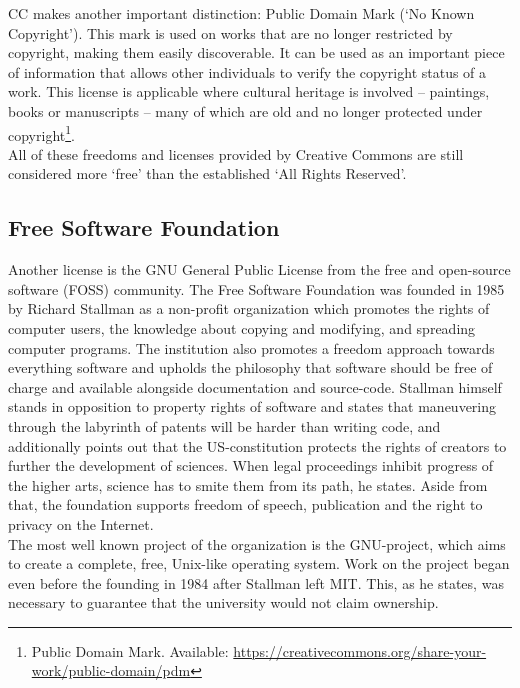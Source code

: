 \documentclass[a4paper]{article}
\begin{document}
\noindent
CC makes another important distinction: Public Domain Mark (`No Known Copyright'). This mark is used on works that are no longer restricted by copyright, making them easily discoverable. It can be used as an important piece of information that allows other individuals to verify the copyright status of a work. This license is applicable where cultural heritage is involved -- paintings, books or manuscripts -- many of which are old and no longer protected under copyright\footnote{Public Domain Mark. Available: \url{https://creativecommons.org/share-your-work/public-domain/pdm}}.\\

\noindent
All of these freedoms and licenses provided by Creative Commons are still considered more `free' than the established `All Rights Reserved'.

\subsection{Free Software Foundation}

Another license is the GNU General Public License from the free and open-source software (FOSS) community. The Free Software Foundation was founded in 1985 by Richard Stallman as a non-profit organization which promotes the rights of computer users, the knowledge about copying and modifying, and spreading computer programs. The institution also promotes a freedom approach towards everything software and upholds the philosophy that software should be free of charge and available alongside documentation and source-code. 
Stallman himself stands in opposition to property rights of software and states that maneuvering through the labyrinth of patents will be harder than writing code, and additionally points out that the US-constitution protects the rights of creators to further the development of sciences. When legal proceedings inhibit progress of the higher arts, science has to smite them from its path, he states. Aside from that, the foundation supports freedom of speech, publication and the right to privacy on the Internet.\\

\noindent
The most well known project of the organization is the GNU-project, which aims to create a complete, free, Unix-like operating system. Work on the project began even before the founding in 1984 after Stallman left MIT. This, as he states, was necessary to guarantee that the university would not claim ownership.\\ 
\end{document}
